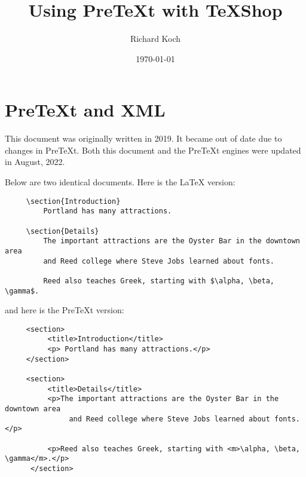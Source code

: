 \documentclass[11pt, oneside]{article}   	%
\title{Using PreTeXt with TeXShop}
\author{Richard Koch}
\date{\today}							%
\begin{document}
\maketitle


\section{PreTeXt and XML}
 This document was originally written in 2019. It became out of date due to changes in PreTeXt. Both this document and the PreTeXt engines were updated in August, 2022. 
 
 Below are two identical documents. Here is the LaTeX version:%
\begin{verbatim}
     \section{Introduction}
         Portland has many attractions.

     \section{Details}
         The important attractions are the Oyster Bar in the downtown area 
         and Reed college where Steve Jobs learned about fonts. 

         Reed also teaches Greek, starting with $\alpha, \beta, \gamma$.
\end{verbatim}
 \vspace{.1in}
 and here is the PreTeXt version:
 \vspace{.1in}
 \begin{verbatim}
     <section>
          <title>Introduction</title>
          <p> Portland has many attractions.</p>
     </section>
      
     <section>
          <title>Details</title>
          <p>The important attractions are the Oyster Bar in the downtown area 
               and Reed college where Steve Jobs learned about fonts. </p>
     
          <p>Reed also teaches Greek, starting with <m>\alpha, \beta, \gamma</m>.</p>
      </section>
\end{verbatim}
\end{document}
